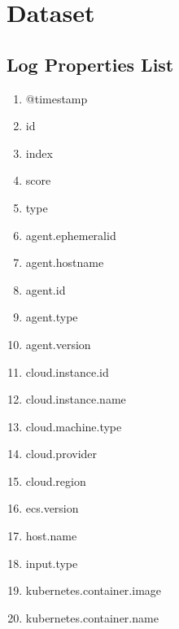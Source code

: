 \chapter{Dataset}

\section{Log Properties List}
\label{appendix:log-properties}
\begin{enumerate}
\item @timestamp

\item \textunderscore id
	
\item \textunderscore index
	
\item \textunderscore score

\item \textunderscore type
	
\item agent.ephemeral\textunderscore id
	
\item agent.hostname
	
\item agent.id
	
\item agent.type
	
\item agent.version
	
\item cloud.instance.id
	
\item cloud.instance.name
	
\item cloud.machine.type
	
\item cloud.provider
	
\item cloud.region
	
\item ecs.version
	
\item host.name
	
\item input.type
	
\item kubernetes.container.image
	
\item kubernetes.container.name
	

\end{enumerate}
